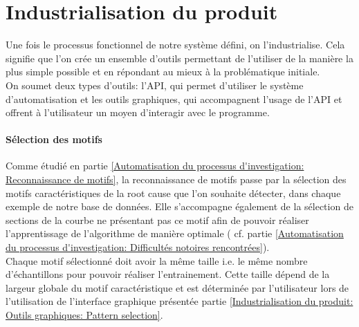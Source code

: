 \chapter{Industrialisation du produit}
\label{Industrialisation du produit}
\thispagestyle{fancy}
Une fois le processus fonctionnel de notre système défini, on l'industrialise. Cela signifie que l'on crée un ensemble d'outils permettant de l'utiliser de la manière la plus simple possible et en répondant au mieux à la problématique initiale. \\
On soumet deux types d'outils: l'API, qui permet d'utiliser le système d'automatisation et les outils graphiques, qui accompagnent l'usage de l'API et offrent à l'utilisateur un moyen d'interagir avec le programme.  



\subsubsection{Sélection des motifs}
\label{Industrialisation du produit: API: Sélection des motifs}
Comme étudié en partie \ref{Automatisation du processus d'investigation: Reconnaissance de motifs}, la reconnaissance de motifs passe par la sélection des motifs caractéristiques de la root cause que l'on souhaite détecter, dans chaque exemple de notre base de données. Elle s'accompagne également de  la sélection de sections de la courbe ne présentant pas ce motif afin de pouvoir réaliser l'apprentissage de l'algorithme de manière optimale ( cf. partie \ref{Automatisation du processus d'investigation: Difficultés notoires rencontrées}).\\
 Chaque motif sélectionné doit avoir la même taille i.e. le même nombre d'échantillons pour pouvoir réaliser l'entrainement. Cette taille dépend de la largeur globale du motif caractéristique et est déterminée par l'utilisateur lors de l'utilisation de l'interface graphique présentée partie \ref{Industrialisation du produit: Outils graphiques: Pattern selection}.   

